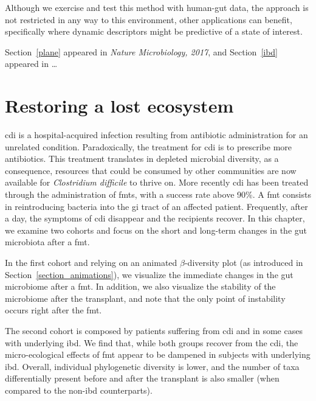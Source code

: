 \documentclass[12pt,chapterheads]{ucsd}
\begin{document}
Although we exercise and test this method with human-gut data, the approach is 
not restricted in any way to this environment, other applications can benefit, 
specifically where dynamic descriptors might be predictive of a state of 
interest.

Section~\ref{plane} appeared in \textsl{Nature Microbiology, 2017}, and 
Section~\ref{ibd} appeared in \dots




\chapter{Restoring a lost ecosystem}\label{chapter_fmts}
\glsresetall

\gls{cdi} is a hospital-acquired infection resulting from antibiotic 
administration for an unrelated condition. Paradoxically, the treatment for 
\gls{cdi} is to prescribe more antibiotics. This treatment translates in
depleted microbial diversity, as a consequence, resources that could be 
consumed by other communities are now available for \textit{Clostridium 
difficile} to thrive on.  More recently \gls{cdi} has been treated through the 
administration of \glspl{fmt}, with a success rate above 90\%\cite{RN4129}. A 
\gls{fmt} consists in reintroducing bacteria into the \gls{gi} tract of an 
affected patient. Frequently, after a day, the symptoms of \gls{cdi} disappear 
and the recipients recover. In this chapter, we examine two cohorts and focus 
on the short and long-term changes in the gut microbiota after a \gls{fmt}.

In the first cohort and relying on an animated $\beta$-diversity plot (as 
introduced in Section~\ref{section_animations}), we visualize the immediate 
changes in the gut microbiome after a \gls{fmt}. In addition, we also visualize 
the stability of the microbiome after the transplant, and note that the only 
point of instability occurs right after the \gls{fmt}.

The second cohort is composed by patients suffering from \gls{cdi} and in some 
cases with underlying \gls{ibd}. We find that, while both groups recover from 
the \gls{cdi}, the micro-ecological effects of \gls{fmt} appear to be dampened 
in subjects with underlying \gls{ibd}. Overall, individual phylogenetic 
diversity is lower, and the number of taxa differentially present before and 
after the transplant is also smaller (when compared to the non-\gls{ibd} 
counterparts).
\end{document}
